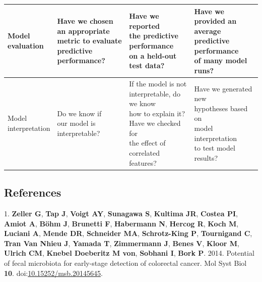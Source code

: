 \documentclass[11pt,]{article}
\begin{document}
\begin{tabular}{|l|l|l|l|}
\makecell[l]{Model \\ evaluation} & \makecell[l]{Have we chosen an appropriate \\ metric to evaluate \\ predictive performance?} & \makecell[l]{Have we reported \\ the predictive performance \\ on a held-out test data?} & \makecell[l]{Have we provided an average \\ predictive performance \\ of many model runs? } \\ \hline

\makecell[l]{Model \\ interpretation} & \makecell[l]{Do we know if \\ our model is \\ interpretable?} & \makecell[l]{If the model is not \\ interpretable, do we know \\how to  explain it? \\ Have we checked for \\ the effect of correlated \\ features?} & \makecell[l]{Have we generated new \\ hypotheses based on \\ model interpretation \\ to test model results? } \\ \hline

\end{tabular}\newpage

\subsection{References}\label{references}

\hypertarget{refs}{}
\hypertarget{ref-zeller_potential_2014}{}
1. \textbf{Zeller G}, \textbf{Tap J}, \textbf{Voigt AY},
\textbf{Sunagawa S}, \textbf{Kultima JR}, \textbf{Costea PI},
\textbf{Amiot A}, \textbf{Böhm J}, \textbf{Brunetti F},
\textbf{Habermann N}, \textbf{Hercog R}, \textbf{Koch M},
\textbf{Luciani A}, \textbf{Mende DR}, \textbf{Schneider MA},
\textbf{Schrotz-King P}, \textbf{Tournigand C}, \textbf{Tran Van Nhieu
J}, \textbf{Yamada T}, \textbf{Zimmermann J}, \textbf{Benes V},
\textbf{Kloor M}, \textbf{Ulrich CM}, \textbf{Knebel Doeberitz M von},
\textbf{Sobhani I}, \textbf{Bork P}. 2014. Potential of fecal microbiota
for early-stage detection of colorectal cancer. Mol Syst Biol
\textbf{10}.
doi:\href{https://doi.org/10.15252/msb.20145645}{10.15252/msb.20145645}.
\end{document}
